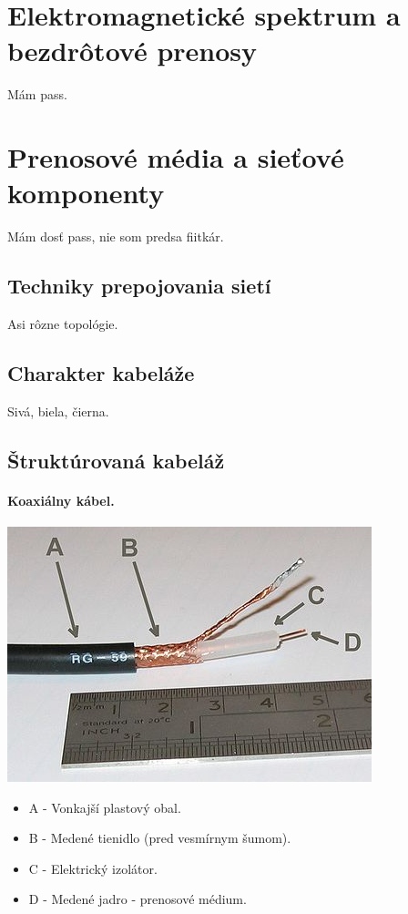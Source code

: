 \documentclass[10pt,a4paper]{article}
\begin{document}
\section{Elektromagnetické spektrum a bezdrôtové prenosy}  

Mám pass. 

\section{Prenosové média a sieťové komponenty} 
Mám dosť pass, nie som predsa fiitkár. 

\subsection{Techniky prepojovania sietí}  
Asi rôzne topológie. 

\subsection{Charakter kabeláže}     
Sivá, biela, čierna. 

\subsection{Štruktúrovaná kabeláž}  
\paragraph{Koaxiálny kábel.}
\begin{center}
\includegraphics[scale=0.5]{coaxial.jpg}
\end{center}
\begin{itemize}
\item A - Vonkajší plastový obal. 
\item B - Medené tienidlo (pred vesmírnym šumom). 
\item C - Elektrický izolátor.
\item D - Medené jadro - prenosové médium. 
\end{itemize}
\end{document}
